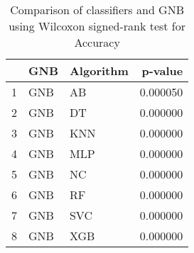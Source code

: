 \begin{table}
\footnotesize
\caption{Comparison of classifiers and GNB using Wilcoxon signed-rank test for Accuracy}
\label{tab:GNB wilcoxon Accuracy comparison}
\begin{tabular}{lllr}
\hline
 & GNB & Algorithm & p-value \\
\hline
1 & GNB & AB & 0.000050 \\
2 & GNB & DT & 0.000000 \\
3 & GNB & KNN & 0.000000 \\
4 & GNB & MLP & 0.000000 \\
5 & GNB & NC & 0.000000 \\
6 & GNB & RF & 0.000000 \\
7 & GNB & SVC & 0.000000 \\
8 & GNB & XGB & 0.000000 \\
\hline
\end{tabular}
\end{table}

